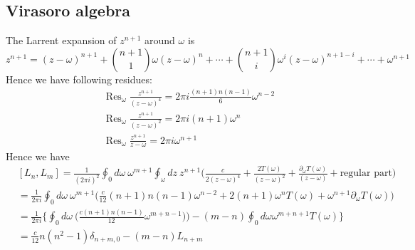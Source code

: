 \documentclass[11pt,a4paper]{article}
\theoremstyle{definition}
\DeclareMathOperator{\res}{Res}
\begin{document}
\subsection{Virasoro algebra}
The Larrent expansion of $z^{n+1}$ around $\omega$ is 
\[
z^{n+1}= (z- \omega)^{n+1} + \binom{n+1}{1} \omega (z-\omega)^n + \cdots + \binom{n+1}{i}\omega^i (z-\omega)^{n+1 -i} +\cdots + \omega^{n+1}
\]
 Hence we have following residues:
 \[
 \begin{aligned}
 &\res_{\omega} \frac{z^{n+1}}{(z-\omega)^4}= 2 \pi i \frac{(n+1)n(n-1)}{6} \omega^{n-2}\\ 
&\res_{\omega} \frac{z^{n+1}}{(z-\omega)^2}= 2 \pi i (n+1) \omega^n\\
&\res_{\omega} \frac{z^{n+1}}{z-\omega}= 2 \pi i \omega^{n+1}
 \end{aligned}
 \]
  Hence we have 
  \[
  \begin{aligned}
  &[L_n, L_m] = \frac{1}{(2 \pi i )^2} \oint_0 d \omega\ \omega^{m+1} \oint_\omega dz\ z^{n+1} \big(\frac{c}{2(z-\omega)^4} + \frac{2T(\omega)}{(z-\omega)^2} + \frac{\partial_\omega T(\omega)}{(z-\omega)} + \text{regular part}\big)\\
  &= \frac{1}{2 \pi i} \oint_0 d\omega\ \omega^{m+1} \big( \frac{c}{12}(n+1)n(n-1) \omega^{n-2} + 2(n+1) \omega ^n T(\omega) + \omega^{n+1} \partial_{\omega} T(\omega) \big)&\\
 &= \frac{1}{2 \pi i} \Big\{\oint_0 d\omega\ \Big( \frac{c(n+1) n(n-1)}{12} \omega^{m+n-1} )\Big) - (m-n) \oint_0 d\omega \omega^{m+n +1 } T(\omega) \Big\}&\\
 &= \frac{c}{12} n (n^2-1) \delta_{n+m,0} - (m-n) L_{n+m}
  \end{aligned}
  \]
\end{document}
